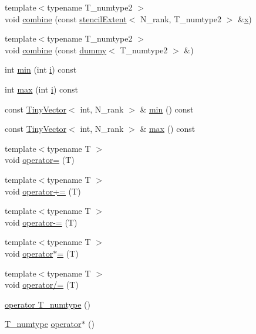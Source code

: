 \begin{DoxyCompactItemize}
\item 
{\footnotesize template$<$typename T\+\_\+numtype2 $>$ }\\void \hyperlink{classstencilExtent_a389ef499ff977cd822b6a8a5bd56b277}{combine} (const \hyperlink{classstencilExtent}{stencil\+Extent}$<$ N\+\_\+rank, T\+\_\+numtype2 $>$ \&\hyperlink{vecnorm1_8cc_ac73eed9e41ec09d58f112f06c2d6cb63}{x})
\item 
{\footnotesize template$<$typename T\+\_\+numtype2 $>$ }\\void \hyperlink{classstencilExtent_a4631c0622589ac3dea11bdbe6e43d2d1}{combine} (const \hyperlink{classdummy}{dummy}$<$ T\+\_\+numtype2 $>$ \&)
\item 
int \hyperlink{classstencilExtent_a99c139ee02c3f19874df474c0cfaa681}{min} (int \hyperlink{indexexpr_8h_aabd77643995707c185e95c8cb2782c81}{i}) const 
\item 
int \hyperlink{classstencilExtent_a96ac8cf95f713941ca635655bbba9f94}{max} (int \hyperlink{indexexpr_8h_aabd77643995707c185e95c8cb2782c81}{i}) const 
\item 
const \hyperlink{classTinyVector}{Tiny\+Vector}$<$ int, N\+\_\+rank $>$ \& \hyperlink{classstencilExtent_a2350988a0e56145caaa163eb87d6a844}{min} () const 
\item 
const \hyperlink{classTinyVector}{Tiny\+Vector}$<$ int, N\+\_\+rank $>$ \& \hyperlink{classstencilExtent_a0ba2ff945ff6788eaf8b21f5e5731040}{max} () const 
\item 
{\footnotesize template$<$typename T $>$ }\\void \hyperlink{classstencilExtent_acce3a75a178dfbafa2c2e1aab59683b5}{operator=} (T)
\item 
{\footnotesize template$<$typename T $>$ }\\void \hyperlink{classstencilExtent_a3404e13e13c5b27dd0351e4f75bb5008}{operator+=} (T)
\item 
{\footnotesize template$<$typename T $>$ }\\void \hyperlink{classstencilExtent_ac4b7ed6ea793099c18995839e96b94aa}{operator-\/=} (T)
\item 
{\footnotesize template$<$typename T $>$ }\\void \hyperlink{classstencilExtent_a5fa7744d8046be098dd325650439996e}{operator$\ast$=} (T)
\item 
{\footnotesize template$<$typename T $>$ }\\void \hyperlink{classstencilExtent_a3ff1b5731685269e856a4584e0ca4efa}{operator/=} (T)
\item 
\hyperlink{classstencilExtent_a7bbb6bcc71f47aaa75d875f848a66ca6}{operator T\+\_\+numtype} ()
\item 
\hyperlink{classstencilExtent_a93a97a73c5ca309121de8deb65521b0a}{T\+\_\+numtype} \hyperlink{classstencilExtent_a64f4e4a657d062c7f5f82278b1c08823}{operator$\ast$} ()
\end{DoxyCompactItemize}


